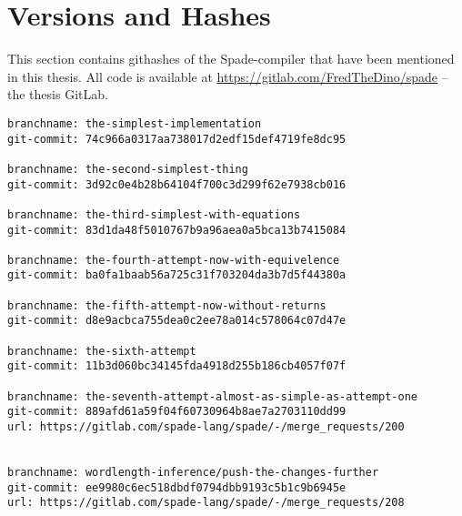\chapter{Versions and Hashes}
\label{app:VersionsAndGitHashes}
This section contains githashes of the Spade-compiler that have been mentioned in this thesis.
All code is available at \href{https://gitlab.com/FredTheDino/spade}{https://gitlab.com/FredTheDino/spade} -- the thesis GitLab.
\begin{verbatim}
branchname: the-simplest-implementation
git-commit: 74c966a0317aa738017d2edf15def4719fe8dc95

branchname: the-second-simplest-thing
git-commit: 3d92c0e4b28b64104f700c3d299f62e7938cb016

branchname: the-third-simplest-with-equations
git-commit: 83d1da48f5010767b9a96aea0a5bca13b7415084

branchname: the-fourth-attempt-now-with-equivelence
git-commit: ba0fa1baab56a725c31f703204da3b7d5f44380a

branchname: the-fifth-attempt-now-without-returns
git-commit: d8e9acbca755dea0c2ee78a014c578064c07d47e

branchname: the-sixth-attempt
git-commit: 11b3d060bc34145fda4918d255b186cb4057f07f

branchname: the-seventh-attempt-almost-as-simple-as-attempt-one
git-commit: 889afd61a59f04f60730964b8ae7a2703110dd99
url: https://gitlab.com/spade-lang/spade/-/merge_requests/200


branchname: wordlength-inference/push-the-changes-further
git-commit: ee9980c6ec518dbdf0794dbb9193c5b1c9b6945e
url: https://gitlab.com/spade-lang/spade/-/merge_requests/208
\end{verbatim}
